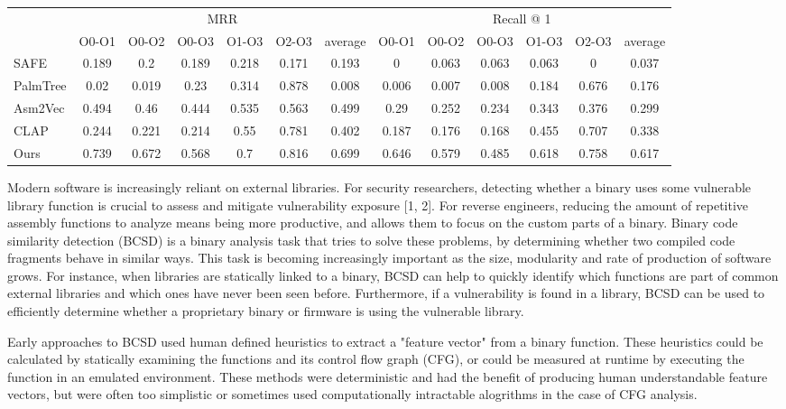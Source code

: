 \documentclass[conference,compsoc]{IEEEtran}
\begin{document}
\begin{table*}[!t]
\begin{tabular}{l|c|c|c|c|c|c|c|c|c|c|c|c|}
{\multirow{2}{*}{Models}} & \multicolumn{6}{c|}{MRR}                        & \multicolumn{6}{c|}{Recall @ 1}                 \\ \cline{2-13}
{}                        & O0-O1 & O0-O2 & O0-O3 & O1-O3 & O2-O3 & average & O0-O1 & O0-O2 & O0-O3 & O1-O3 & O2-O3 & average \\ \hline
{SAFE}                    & 0.189 & 0.2   & 0.189 & 0.218 & 0.171 & 0.193   & 0     & 0.063 & 0.063 & 0.063 & 0     & 0.037   \\
{PalmTree}                & 0.02  & 0.019 & 0.23  & 0.314 & 0.878 & 0.008   & 0.006 & 0.007 & 0.008 & 0.184 & 0.676 & 0.176   \\
{Asm2Vec}                 & 0.494 & 0.46  & 0.444 & 0.535 & 0.563 & 0.499   & 0.29  & 0.252 & 0.234 & 0.343 & 0.376 & 0.299   \\
{CLAP}                    & 0.244 & 0.221 & 0.214 & 0.55  & 0.781 & 0.402   & 0.187 & 0.176 & 0.168 & 0.455 & 0.707 & 0.338   \\ \hline
{Ours}                    & 0.739 & 0.672 & 0.568 & 0.7   & 0.816 & 0.699   & 0.646 & 0.579 & 0.485 & 0.618 & 0.758 & 0.617 
\end{tabular}
\end{table*}

Modern software is increasingly reliant on external libraries.
For security researchers, detecting whether a binary uses some vulnerable library function is crucial to assess
and mitigate vulnerability exposure [1, 2]. For reverse engineers, reducing the amount of repetitive assembly functions
to analyze means being more productive, and allows them to focus on the custom parts of a binary.  Binary code similarity
detection (BCSD) is a binary analysis task that tries to solve these problems, by determining whether two compiled
code fragments behave in similar ways. This task is becoming increasingly important as the size, modularity and rate of
production of software grows.  For instance, when libraries are statically linked to a binary, BCSD can help to
quickly identify which functions are part of common external libraries and which ones have never been seen before.
Furthermore, if a vulnerability is found in a library, BCSD can be used to efficiently determine whether a proprietary
binary or firmware is using the vulnerable library.

Early approaches to BCSD used human defined heuristics to extract a "feature vector" from a binary function. These heuristics
could be calculated by statically examining the functions and its control flow graph (CFG), or could be measured at runtime
by executing the function in an emulated environment. These methods were deterministic and had the benefit of producing
human understandable feature vectors, but were often too simplistic or sometimes used computationally intractable alogrithms in
the case of CFG analysis.
\end{document}
